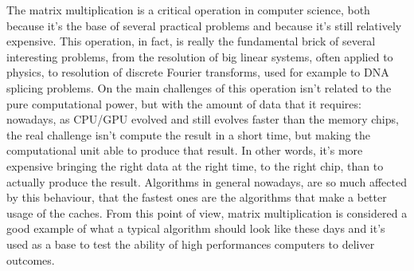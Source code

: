 The matrix multiplication is a critical operation in computer science, both because it’s the base of several practical problems and because it’s still relatively expensive.
This operation, in fact, is really the fundamental brick of several interesting problems, from the resolution of big linear systems, often applied to physics, to resolution of discrete Fourier transforms, used for example to DNA splicing problems.
On the main challenges of this operation isn’t related to the pure computational power, but with the amount of data that it requires: nowadays, as CPU/GPU evolved and still evolves faster than the memory chips, the real challenge isn’t compute the result in a short time, but making the computational unit able to produce that result. In other words, it’s more expensive bringing the right data at the right time, to the right chip, than to actually produce the result.
Algorithms in general nowadays, are so much affected by this behaviour, that the fastest ones are the algorithms that make a better usage of the caches.
From this point of view, matrix multiplication is considered a good example of what a typical algorithm should look like these days and it’s used as a base to test the ability of high performances computers to deliver outcomes. 
